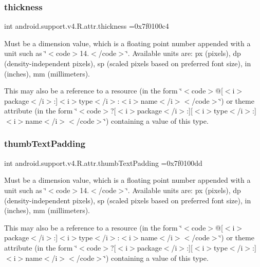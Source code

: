 \subsubsection{\texorpdfstring{thickness}{thickness}}
{\footnotesize\ttfamily int android.\+support.\+v4.\+R.\+attr.\+thickness =0x7f0100c4\hspace{0.3cm}{\ttfamily [static]}}

Must be a dimension value, which is a floating point number appended with a unit such as \char`\"{}$<$code$>$14.\+5sp$<$/code$>$\char`\"{}. Available units are\+: px (pixels), dp (density-\/independent pixels), sp (scaled pixels based on preferred font size), in (inches), mm (millimeters). 

This may also be a reference to a resource (in the form \char`\"{}$<$code$>$@\mbox{[}$<$i$>$package$<$/i$>$\+:\mbox{]}$<$i$>$type$<$/i$>$\+:$<$i$>$name$<$/i$>$$<$/code$>$\char`\"{}) or theme attribute (in the form \char`\"{}$<$code$>$?\mbox{[}$<$i$>$package$<$/i$>$\+:\mbox{]}\mbox{[}$<$i$>$type$<$/i$>$\+:\mbox{]}$<$i$>$name$<$/i$>$$<$/code$>$\char`\"{}) containing a value of this type. \mbox{\label{classandroid_1_1support_1_1v4_1_1R_1_1attr_abc9134fe1050fd996d652ba07079076f}} 
\subsubsection{\texorpdfstring{thumb\+Text\+Padding}{thumbTextPadding}}
{\footnotesize\ttfamily int android.\+support.\+v4.\+R.\+attr.\+thumb\+Text\+Padding =0x7f0100dd\hspace{0.3cm}{\ttfamily [static]}}

Must be a dimension value, which is a floating point number appended with a unit such as \char`\"{}$<$code$>$14.\+5sp$<$/code$>$\char`\"{}. Available units are\+: px (pixels), dp (density-\/independent pixels), sp (scaled pixels based on preferred font size), in (inches), mm (millimeters). 

This may also be a reference to a resource (in the form \char`\"{}$<$code$>$@\mbox{[}$<$i$>$package$<$/i$>$\+:\mbox{]}$<$i$>$type$<$/i$>$\+:$<$i$>$name$<$/i$>$$<$/code$>$\char`\"{}) or theme attribute (in the form \char`\"{}$<$code$>$?\mbox{[}$<$i$>$package$<$/i$>$\+:\mbox{]}\mbox{[}$<$i$>$type$<$/i$>$\+:\mbox{]}$<$i$>$name$<$/i$>$$<$/code$>$\char`\"{}) containing a value of this type. \mbox{\label{classandroid_1_1support_1_1v4_1_1R_1_1attr_aaa11a7e1e11d0e32f6bae3e8951a2fb8}} 
